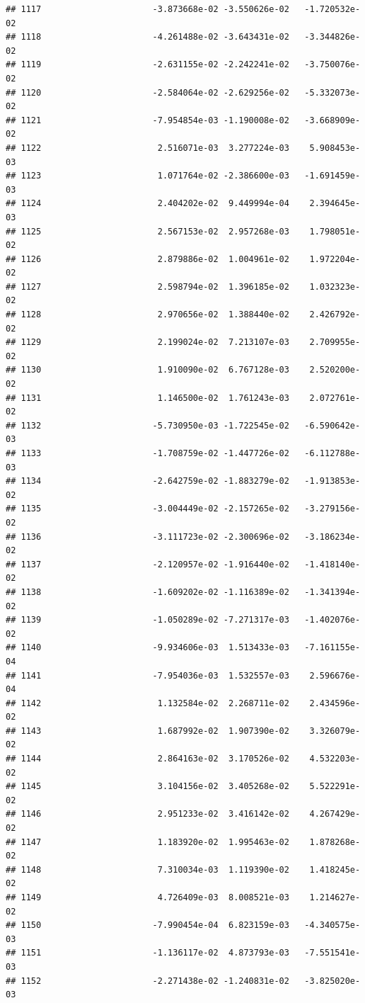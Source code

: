 \documentclass[
]{article}
\begin{document}
\begin{verbatim}
## 1117                      -3.873668e-02 -3.550626e-02   -1.720532e-02
## 1118                      -4.261488e-02 -3.643431e-02   -3.344826e-02
## 1119                      -2.631155e-02 -2.242241e-02   -3.750076e-02
## 1120                      -2.584064e-02 -2.629256e-02   -5.332073e-02
## 1121                      -7.954854e-03 -1.190008e-02   -3.668909e-02
## 1122                       2.516071e-03  3.277224e-03    5.908453e-03
## 1123                       1.071764e-02 -2.386600e-03   -1.691459e-03
## 1124                       2.404202e-02  9.449994e-04    2.394645e-03
## 1125                       2.567153e-02  2.957268e-03    1.798051e-02
## 1126                       2.879886e-02  1.004961e-02    1.972204e-02
## 1127                       2.598794e-02  1.396185e-02    1.032323e-02
## 1128                       2.970656e-02  1.388440e-02    2.426792e-02
## 1129                       2.199024e-02  7.213107e-03    2.709955e-02
## 1130                       1.910090e-02  6.767128e-03    2.520200e-02
## 1131                       1.146500e-02  1.761243e-03    2.072761e-02
## 1132                      -5.730950e-03 -1.722545e-02   -6.590642e-03
## 1133                      -1.708759e-02 -1.447726e-02   -6.112788e-03
## 1134                      -2.642759e-02 -1.883279e-02   -1.913853e-02
## 1135                      -3.004449e-02 -2.157265e-02   -3.279156e-02
## 1136                      -3.111723e-02 -2.300696e-02   -3.186234e-02
## 1137                      -2.120957e-02 -1.916440e-02   -1.418140e-02
## 1138                      -1.609202e-02 -1.116389e-02   -1.341394e-02
## 1139                      -1.050289e-02 -7.271317e-03   -1.402076e-02
## 1140                      -9.934606e-03  1.513433e-03   -7.161155e-04
## 1141                      -7.954036e-03  1.532557e-03    2.596676e-04
## 1142                       1.132584e-02  2.268711e-02    2.434596e-02
## 1143                       1.687992e-02  1.907390e-02    3.326079e-02
## 1144                       2.864163e-02  3.170526e-02    4.532203e-02
## 1145                       3.104156e-02  3.405268e-02    5.522291e-02
## 1146                       2.951233e-02  3.416142e-02    4.267429e-02
## 1147                       1.183920e-02  1.995463e-02    1.878268e-02
## 1148                       7.310034e-03  1.119390e-02    1.418245e-02
## 1149                       4.726409e-03  8.008521e-03    1.214627e-02
## 1150                      -7.990454e-04  6.823159e-03   -4.340575e-03
## 1151                      -1.136117e-02  4.873793e-03   -7.551541e-03
## 1152                      -2.271438e-02 -1.240831e-02   -3.825020e-03

\end{verbatim}
\end{document}

